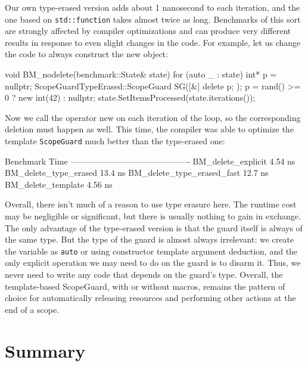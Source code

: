 Our own type-erased version adds about 1 nanosecond to each iteration, and the one based on \texttt{std::function} takes almost twice as long. Benchmarks of this sort are strongly affected by compiler optimizations and can produce very different results in response to even slight changes in the code. For example, let us change the code to always construct the new object:

\begin{code}
void BM_nodelete(benchmark::State& state) {
  for (auto _ : state) {
    int* p = nullptr;
    ScopeGuardTypeErased::ScopeGuard SG([&] { delete p; });
    p = rand() >= 0 ? new int(42) : nullptr;
  }
  state.SetItemsProcessed(state.iterations());
}
\end{code}

Now we call the operator new on each iteration of the loop, so the corresponding deletion must happen as well. This time, the compiler was able to optimize the template \texttt{ScopeGuard} much better than the type-erased one:

\begin{code}
Benchmark                              Time
-------------------------------------------
BM_delete_explicit                  4.54 ns
BM_delete_type_erased               13.4 ns
BM_delete_type_erased_fast          12.7 ns
BM_delete_template                  4.56 ns
\end{code}

Overall, there isn't much of a reason to use type erasure here. The runtime cost may be negligible or significant, but there is usually nothing to gain in exchange. The only advantage of the type-erased version is that the guard itself is always of the same type. But the type of the guard is almost always irrelevant: we create the variable as \texttt{auto} or using constructor template argument deduction, and the only explicit operation we may need to do on the guard is to disarm it. Thus, we never need to write any code that depends on the guard's type. Overall, the template-based ScopeGuard, with or without macros, remains the pattern of choice for automatically releasing resources and performing other actions at the end of a scope.

\section{Summary}

